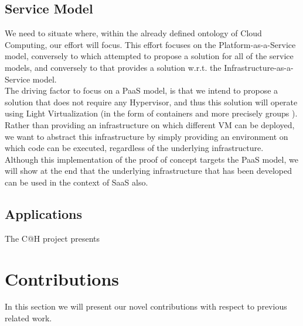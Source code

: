 \documentclass[11pt]{amsart}
\begin{document}
	\subsection{Service Model}
	We need to situate where, within the already defined ontology of Cloud
        Computing, our effort will focus. This effort focuses on the
        Platform-as-a-Service model, conversely to \cite{cathome} which
        attempted to propose a solution for all of the service models, and
        conversely to \cite{P2PCS} that provides a solution w.r.t. the
        Infrastructure-as-a-Service model.  \\ The driving factor to focus on a
        PaaS model, is that we intend to propose a solution that does not
        require any Hypervisor, and thus this solution will operate using Light
        Virtualization (in the form of containers and more precisely groups
        \cite{cgroups}). Rather than providing an infrastructure on which
        different VM can be deployed, we want to abstract this infrastructure by
        simply providing an environment on which code can be executed,
        regardless of the underlying infrastructure.  \\ Although this
        implementation of the proof of concept targets the PaaS model, we will
        show at the end that the underlying infrastructure that has been
        developed can be used in the context of SaaS also.
	
	\subsection{Applications}
	The C@H project presents 
	
	\section{Contributions}
	In this section we will present our novel contributions with respect to previous related work.

\end{document}
